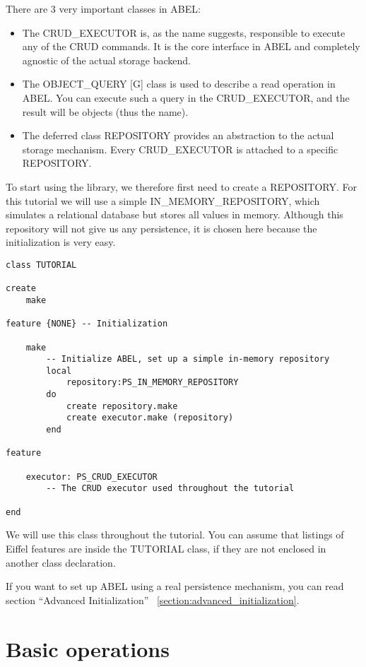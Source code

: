 There are 3 very important classes in ABEL:
\begin{itemize}
 \item The CRUD\_EXECUTOR is, as the name suggests, responsible to execute any of the CRUD commands.
	It is the core interface in ABEL and completely agnostic of the actual storage backend.

 \item The OBJECT\_QUERY [G] class is used to describe a read operation in ABEL. You can execute such a query in the CRUD\_EXECUTOR, and the result will be objects (thus the name).

 \item The deferred class REPOSITORY provides an abstraction to the actual storage mechanism.
	Every CRUD\_EXECUTOR is attached to a specific REPOSITORY.
\end{itemize}


To start using the library, we therefore first need to create a REPOSITORY.
For this tutorial we will use a simple IN\_MEMORY\_REPOSITORY, which simulates a relational database but stores all values in memory.
Although this repository will not give us any persistence, it is chosen here because the initialization is very easy.


\begin{lstlisting}[language=OOSC2Eiffel, captionpos=b, caption={The TUTORIAL class}, label={lst:tutorial_class}]
class TUTORIAL

create
	make

feature {NONE} -- Initialization

	make
		-- Initialize ABEL, set up a simple in-memory repository
		local
			repository:PS_IN_MEMORY_REPOSITORY
		do
			create repository.make
			create executor.make (repository)
		end

feature
	
	executor: PS_CRUD_EXECUTOR
		-- The CRUD executor used throughout the tutorial

end
\end{lstlisting}

We will use this class throughout the tutorial. You can assume that listings of Eiffel features are inside the TUTORIAL class, if they are not enclosed in another class declaration.

If you want to set up ABEL using a real persistence mechanism, you can read section ``Advanced Initialization'' ~\ref{section:advanced_initialization}.

\section{Basic operations}

